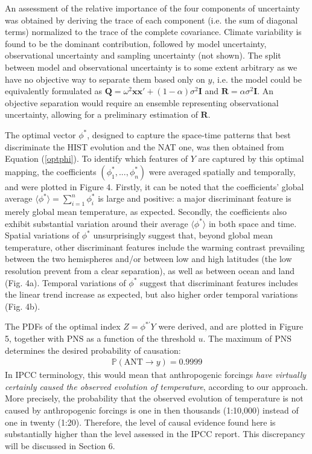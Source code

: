 \documentclass[12pt]{article}
\newcommand{\PNS}{\textrm{PNS}}
\newcommand{\Proba}{\mathbb P}
\newcommand{\x}{\boldsymbol{x}}
\begin{document}
An assessment of the relative importance of the four components of uncertainty was obtained by deriving the trace of each component (i.e. the sum of diagonal terms) normalized to the trace of the complete covariance. Climate variability is found to be the dominant contribution, followed by model uncertainty, observational uncertainty and sampling uncertainty (not shown). %
The split between model and observational uncertainty is to some extent arbitrary as we have no objective way to separate them based only on $y$, i.e. the model could be equivalently formulated as $\mathbf Q=\omega^2\x\x'+(1-\alpha)\sigma^2\mathbf I$ and $\mathbf R=\alpha\sigma^2\mathbf I$. An objective separation would require an ensemble representing observational uncertainty, allowing for a preliminary estimation of $\mathbf R$.

The optimal vector $\phi^*$, designed to capture the space-time patterns that best discriminate the HIST evolution and the NAT one, was then obtained from Equation (\ref{optphi}). To identify which features of $Y$ are captured by this optimal mapping, the coefficients $(\phi^*_1,...,\phi_n^*)$ were averaged spatially and temporally, and were plotted in Figure 4.  Firstly, it can be noted that the coefficients' global average $\langle\phi^*\rangle= \sum_{i=1}^n  \phi^*_i$ is large and positive: a major discriminant feature is merely global mean temperature, as expected. Secondly, the coefficients also exhibit substantial variation around their average $\langle\phi^*\rangle$ in both space and time. Spatial variations of $\phi^*$ unsurprisingly suggest that, beyond global mean temperature, other discriminant features include the warming contrast prevailing between the two hemispheres and/or between low and high latitudes (the low resolution prevent from a clear separation), as well as between ocean and land (Fig. 4a). Temporal variations of $\phi^*$ suggest that discriminant features includes the linear trend increase as expected, but also higher order temporal variations (Fig. 4b).

The PDFs of the optimal index $Z=\phi^{*'}Y$ were derived, and are plotted in Figure 5, together with $\PNS$ as a function of the threshold $u$. The maximum of $\PNS$ determines the desired probability of causation:
\begin{equation}
\label{pns_res}
\begin{array}{ll}
\Proba(\textrm{ANT}\rightarrow y) = 0.9999
\end{array}
\end{equation}
In IPCC terminology, this would mean that anthropogenic forcings \textit{have virtually certainly caused the observed evolution of temperature}, according to our approach. More precisely, the probability that the observed evolution of temperature is not caused by anthropogenic forcings is one in then thousands (1:10,000) instead of one in twenty (1:20). Therefore, the level of causal evidence found here is substantially higher than the level assessed in the IPCC report. This discrepancy will be discussed in Section 6. 
\end{document}
